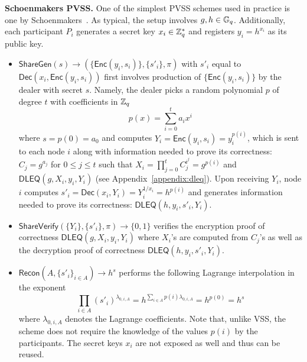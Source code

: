 \noindent\textbf{Schoenmakers PVSS.}
\label{appendix:schoenmakersPVSS}
One of the simplest PVSS schemes used in practice is one by Schoenmakers~\cite{schoenmakers1999simple}. As typical, the setup involves $g, h \in \mathbb{G}_q$. Additionally, each participant $P_i$ generates a secret key $x_i \in \mathbb{Z}^*_q$ and registers $y_i = h^{x_i}$ as its public key.

\begin{itemize}
\item $\mathsf{ShareGen}(s) \rightarrow (\{\mathsf{Enc}(y_i, s_i)\}, \{s'_i\}, \pi)$ with $s'_i$ equal to $\mathsf{Dec}(x_i, \mathsf{Enc}(y_i, s_i))$ first involves production of $\{\mathsf{Enc}(y_i, s_i)\}$ by the dealer with secret $s$. Namely, the dealer picks a random polynomial $p$ of degree $t$ with coefficients in $\mathbb{Z}_q$
\[
p(x) = \sum_{i = 0}^{t} a_i x^i
\]
where $s = p(0) = a_0$ and computes $Y_i = \mathsf{Enc}(y_i, s_i) = y_i^{p(i)}$, which is sent to each node $i$ along with information needed to prove its correctness: $C_j = g^{a_j}$ for $0 \leq j \leq t$ such that $X_i = \prod_{j = 0}^{t} C_j^{i^j} = g^{p(i)}$ and $\mathsf{DLEQ}(g, X_i, y_i, Y_i)$ (see Appendix~\ref{appendix:dleq}). Upon receiving $Y_i$, node $i$ computes $s'_i = \mathsf{Dec}(x_i, Y_i) = Y_i^{1 / x_i} = h^{p(i)}$ and generates information needed to prove its correctness: $\mathsf{DLEQ}(h, y_i, s'_i, Y_i)$.
\item $\mathsf{ShareVerify}(\{Y_i\}, \{s'_i\}, \pi) \rightarrow \{0, 1\}$ verifies the encryption proof of correctness $\mathsf{DLEQ}(g, X_i, y_i, Y_i)$ where $X_i$'s are computed from $C_j$'s as well as the decryption proof of correctness $\mathsf{DLEQ}(h, y_i, s'_i, Y_i)$.
\item $\mathsf{Recon}(A, \{s'_i\}_{i \in A}) \rightarrow h^s$ performs the following Lagrange interpolation in the exponent
\[
\prod_{i \in A} (s'_i)^{\lambda_{0, i, A}} = h^{\sum_{i \in A} p(i) \lambda_{0, i, A}} = h^{p(0)} = h^s
\]
where $\lambda_{0, i, A}$ denotes the Lagrange coefficients. Note that, unlike VSS, the scheme does not require the knowledge of the values $p(i)$ by the participants. The secret keys $x_i$ are not exposed as well and thus can be reused.
\end{itemize}


